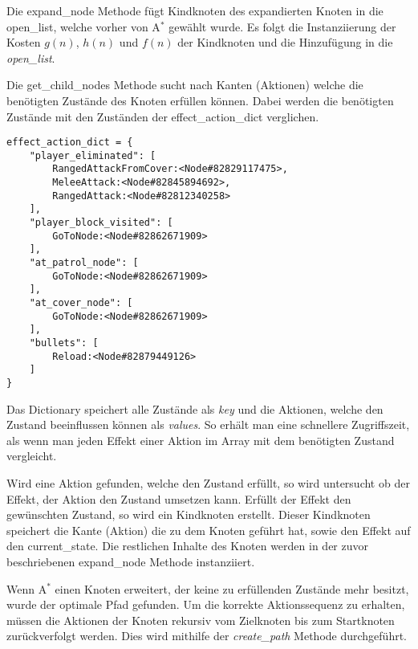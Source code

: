 Die expand\_node Methode fügt Kindknoten des expandierten Knoten in die open\_list, welche vorher von A$^*$ gewählt wurde. Es folgt die Instanziierung der Kosten $g(n)$, $h(n)$ und $f(n)$ der Kindknoten und die Hinzufügung in die \textit{open\_list}.



Die get\_child\_nodes Methode sucht nach Kanten (Aktionen) welche die benötigten Zustände des Knoten erfüllen können. Dabei werden die benötigten Zustände mit den Zuständen der effect\_action\_dict verglichen.

\begin{lstlisting}[language=dict, caption={effect\_action\_dict aus der Implementierung}]
effect_action_dict = {
    "player_eliminated": [
        RangedAttackFromCover:<Node#82829117475>,
        MeleeAttack:<Node#82845894692>,
        RangedAttack:<Node#82812340258>
    ],
    "player_block_visited": [
        GoToNode:<Node#82862671909>
    ],
    "at_patrol_node": [
        GoToNode:<Node#82862671909>
    ],
    "at_cover_node": [
        GoToNode:<Node#82862671909>
    ],
    "bullets": [
        Reload:<Node#82879449126>
    ]
}
\end{lstlisting}

Das Dictionary speichert alle Zustände als \textit{key} und die Aktionen, welche den Zustand beeinflussen können als \textit{values}. So erhält man eine schnellere Zugriffszeit, als wenn man jeden Effekt einer Aktion im Array mit dem benötigten Zustand vergleicht. 

Wird eine Aktion gefunden, welche den Zustand erfüllt, so wird untersucht ob der Effekt, der Aktion den Zustand umsetzen kann. Erfüllt der Effekt den gewünschten Zustand, so wird ein Kindknoten erstellt. Dieser Kindknoten speichert die Kante (Aktion) die zu dem Knoten geführt hat, sowie den Effekt auf den current\_state. Die restlichen Inhalte des Knoten werden in der zuvor beschriebenen expand\_node Methode instanziiert.



Wenn A$^*$ einen Knoten erweitert, der keine zu erfüllenden Zustände mehr besitzt, wurde der optimale Pfad gefunden. Um die korrekte Aktionssequenz zu erhalten, müssen die Aktionen der Knoten rekursiv vom Zielknoten bis zum Startknoten zurückverfolgt werden. Dies wird mithilfe der \textit{create\_path} Methode durchgeführt.



